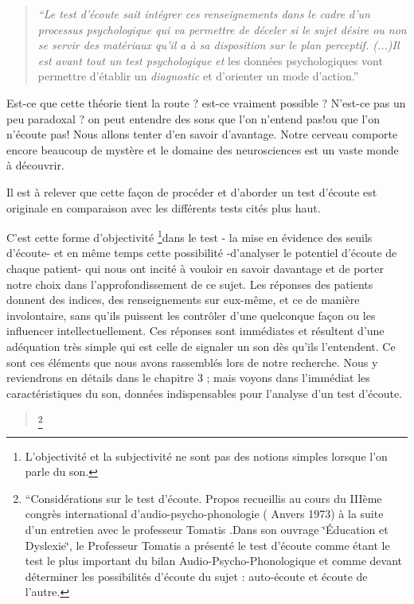 \begin{quote}
\emph{``Le test d'écoute sait intégrer ces renseignements dans le
cadre d'un processus psychologique qui va permettre de déceler si
le sujet désire ou non se servir des matériaux qu'il a à sa disposition
sur le plan perceptif. (...)Il est avant tout un test psychologique
et} les données psychologiques vont permettre d'établir un\emph{ diagnostic}
et d'orienter un mode d'action.''
\end{quote}
Est-ce que cette théorie tient la route ? est-ce vraiment possible
? N'est-ce pas un peu paradoxal ? on peut entendre des sons que l'on
n'entend pas!ou que l'on n'écoute pas! Nous allons tenter d'en savoir
d'avantage. Notre cerveau comporte encore beaucoup de mystère et le
domaine des neurosciences est un vaste monde à découvrir. 

Il est à relever que cette façon de procéder et d'aborder un test
d'écoute est originale en comparaison avec les différents tests cités
plus haut.

C'est cette forme d'objectivité \footnote{L'objectivité et la subjectivité ne sont pas des notions simples lorsque
l'on parle du son.}dans le test - la mise en évidence des seuils d'écoute- et en même
temps cette possibilité -d'analyser le potentiel d'écoute de chaque
patient- qui nous ont incité à vouloir en savoir davantage et de porter
notre choix dans l'approfondissement de ce sujet. Les réponses des
patients donnent des indices, des renseignements sur eux-même, et
ce de manière involontaire, sans qu'ils puissent les contrôler d'une
quelconque façon ou les influencer intellectuellement. Ces réponses
sont immédiates et résultent d'une adéquation très simple qui est
celle de signaler un son dès qu'ils l'entendent. Ce sont ces éléments
que nous avons rassemblés lors de notre recherche. Nous y reviendrons
en détails dans le chapitre 3 ; mais voyons dans l'immédiat les caractéristiques
du son, données indispensables pour l'analyse d'un test d'écoute.
\begin{quote}
\footnote{``Considérations sur le test d'écoute. Propos recueillis au cours
du IIIème congrès international d'audio-psycho-phonologie ( Anvers
1973) à la suite d'un entretien avec le professeur Tomatis .Dans son
ouvrage \char`\"{}Éducation et Dyslexie\char`\"{}, le Professeur Tomatis
a présenté le test d'écoute comme étant le test le plus important
du bilan Audio-Psycho-Phonologique et comme devant déterminer les
possibilités d\textquoteright écoute du sujet : auto-écoute et écoute
de l'autre.}
\end{quote}

